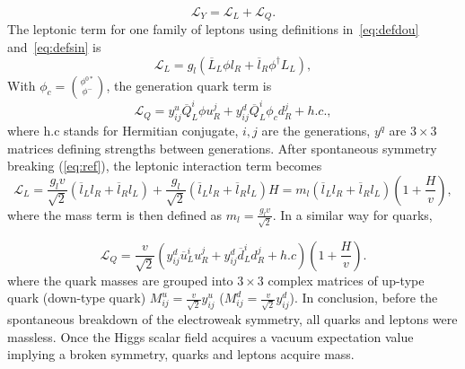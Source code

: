 \begin{equation}
	\mathcal{L}_{Y}= \mathcal{L}_{L} + \mathcal{L}_{Q}.
\end{equation}
The leptonic term for one family of leptons using \DIFaddbegin {}\DIFaddend definitions in~\autoref{eq:defdou} and~\autoref{eq:defsin} is
\begin{equation}
	\mathcal{L}_{L}= g_{l}(\overline{L}_{L}\phi l_{R} + \overline{l}_{R} \phi^{\dagger} L_{L}), 
	\label{eq:SSB1}
\end{equation}
With $\phi_{c}=\binom{\phi^{0*}}{\phi^{-}}$, the \DIFdelbegin {}\DIFdelend \DIFaddbegin {}\DIFaddend generation quark term is
\begin{equation}
	\mathcal{L}_{Q}= y^{u}_{ij}\overline{Q}^{i}_{L}\phi u^{j}_{R} + {y}^{d}_{ij}\overline{Q}^{i}_{L}\phi_{c} d^{j}_{R} + h.c .,
	\label{eq:SSB2}
\end{equation}
where h.c stands for Hermitian conjugate, $i,j$ are the generations, $y^{q}$ are $3\times3$ matrices defining strengths between generations\DIFdelbegin {}\DIFdelend . After spontaneous symmetry breaking (\autoref{eq:ref}), the leptonic interaction term becomes
\begin{equation}
	\mathcal{L}_{L}= \frac{g_{l}v}{\sqrt{2}}(\overline{l}_{L}l_{R} + \overline{l}_{R}l_{L}) + \frac{g_{l}}{\sqrt{2}}(\overline{l}_{L} l_{R}+\overline{l}_{R} l_{L})H = m_{l}(\overline{l}_{L}l_{R} + \overline{l}_{R}l_{L})(1+\frac{H}{v}),
        \label{eq:SSB3}
\end{equation}
where the mass term is then defined as $m_{l}=\frac{g_{l}v}{\sqrt{2}}$. In a similar way for quarks,


\begin{equation}
	\mathcal{L}_{Q}=\frac{v}{\sqrt{2}}(y^{d}_{ij}\overline{u}^{i}_{L} u^{j}_{R} + {y}_{ij}^{d}\overline{d}^{i}_{L} d^{j}_{R} + h.c)(1+\frac{H}{v}).
	\label{eq:SSB4}
\end{equation}
where the quark masses are grouped into $3\times3$ complex matrices of up-type quark (down-type quark) $M^{u}_{ij}=\frac{v}{\sqrt{2}}y_{ij}^{u}$ ($M^{d}_{ij}=\frac{v}{\sqrt{2}}y_{ij}^{d}$).
In conclusion, before the spontaneous breakdown of the electroweak symmetry, all quarks and leptons were massless. Once the Higgs scalar field acquires a vacuum expectation value implying a broken symmetry, quarks and leptons acquire mass. \DIFdelbegin {}\DIFdelend %
\DIFaddbegin 

